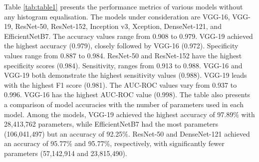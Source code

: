 \documentclass{article}
\begin{document}
\begin{table}
    \caption{Performance Metrics of Convolutional Neural Network Models without Histogram Equalization}
    \label{tab:table1}
\end{table}

Table \ref{tab:table1} presents the performance metrics of various models without any histogram equalisation. The models under consideration are VGG-16, VGG-19, ResNet-50, ResNet-152, Inception v3, Xception, DenseNet-121, and EfficientNetB7. The accuracy values range from 0.908 to 0.979. VGG-19 achieved the highest accuracy (0.979), closely followed by VGG-16 (0.972). Specificity values range from 0.887 to 0.984. ResNet-50 and ResNet-152 have the highest specificity scores (0.984). Sensitivity, ranges from 0.913 to 0.988. VGG-16 and VGG-19 both demonstrate the highest sensitivity values (0.988). VGG-19 leads with the highest F1 score (0.981). The AUC-ROC values vary from 0.937 to 0.996. VGG-16 has the highest AUC-ROC value (0.998). The table also presents a comparison of model accuracies with the number of parameters used in each model. Among the models, VGG-19 achieved the highest accuracy of 97.89\% with 28,413,762 parameters, while EfficientNetB7 had the most parameters (106,041,497) but an accuracy of 92.25\%. ResNet-50 and DenseNet-121 achieved an accuracy of 95.77\% and 95.77\%, respectively, with significantly fewer parameters (57,142,914 and 23,815,490).
\end{document}
